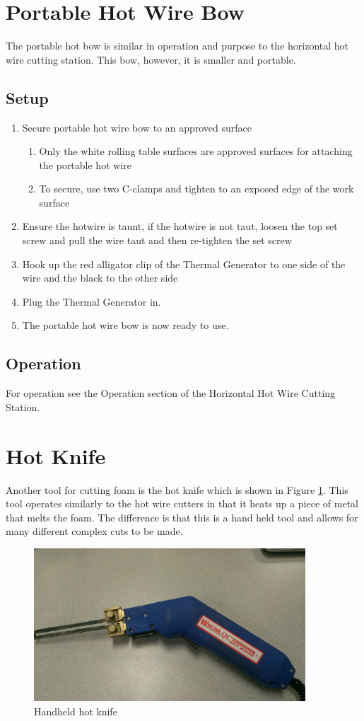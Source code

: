 \section{Portable Hot Wire Bow}
The portable hot bow is similar in operation and purpose to the horizontal hot wire cutting station. This bow, however, it is smaller and portable.
\subsection{Setup}
\begin{enumerate}
\item Secure portable hot wire bow to an approved surface
\begin{enumerate}
\item Only the white rolling table surfaces are approved surfaces for attaching the portable hot wire
\item To secure, use two C-clamps and tighten to an exposed edge of the work surface
\end{enumerate}

\item Ensure the hotwire is taunt, if the hotwire is not taut, loosen the top set screw and pull the wire taut and then re-tighten the set screw
\item Hook up the red alligator clip of the Thermal Generator to one side of the wire and the black to the other side
\item Plug the Thermal Generator in. 
\item The portable hot wire bow is now ready to use.
\end{enumerate}
\subsection{Operation}
For operation see the Operation section of the Horizontal Hot Wire Cutting Station.
\section{Hot Knife}
Another tool for cutting foam is the hot knife which is shown in Figure \ref{fig:hotknife}. This tool operates similarly to the hot wire cutters in that it heats up a piece of metal that melts the foam. The difference is that this is a hand held tool and allows for many different complex cuts to be made.

\begin{figure}[ht]
\centering
\includegraphics[width=4in]{images/IMAG0229}
\caption{Handheld hot knife}
\label{fig:hotknife}
\end{figure}

